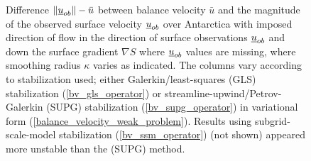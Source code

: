\begin{figure}
  \caption[Antarctica balance-velocity misfit with $\mathbf{d}^{\text{data}} = -\nabla S$ where $\mathbf{u}_{ob}$ are missing.]{Difference $\Vert \underline{u}_{ob} \Vert - \bar{u}$ between balance velocity $\bar{u}$ and the magnitude of the observed surface velocity $\underline{u}_{ob}$ over Antarctica with imposed direction of flow in the direction of surface observations $\underline{u}_{ob}$ and down the surface gradient $\nabla S$ where $\underline{u}_{ob}$ values are missing, where smoothing radius $\kappa$ varies as indicated.  The columns vary according to stabilization used; either Galerkin/least-squares (GLS) stabilization (\ref{bv_gls_operator}) or streamline-upwind/Petrov-Galerkin (SUPG) stabilization (\ref{bv_supg_operator}) in variational form (\ref{balance_velocity_weak_problem}).  Results using subgrid-scale-model stabilization (\ref{bv_ssm_operator}) (not shown) appeared more unstable than the (SUPG) method.}

  \label{antarctica_bv_image_gS_m_U_misfit}

\end{figure}
